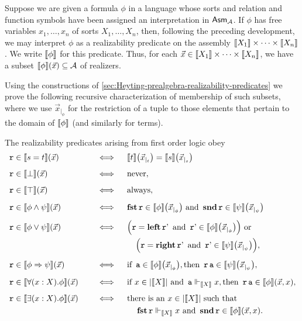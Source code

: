 Suppose we are given a formula \(\phi\) in a language whose sorts and relation
and function symbols have been assigned an interpretation in \(\mathsf{Asm}_{\mathcal A}\).
%
If \(\phi\) has free variables \(x_1,\dots,x_n\) of sorts \(X_1,\dots,X_n\),
then, following the preceding development, we may interpret \(\phi\) as a
realizability predicate on the assembly \(\llbracket X_1\rrbracket \times \cdots\times \llbracket X_n\rrbracket\).
%
We write \(\llbracket\phi\rrbracket\) for this predicate. Thus, for each
\(\vec x \in \llbracket X_1\rrbracket\times\cdots\times\llbracket X_n\rrbracket\), we have a subset
\(\llbracket\phi\rrbracket(\vec x) \subseteq \mathcal A\) of realizers.

Using the constructions of
\cref{sec:Heyting-prealgebra-realizability-predicates} we prove the following
recursive characterization of membership of such subsets, where we use
\(\vec x_{|_\phi}\) for the restriction of a tuple to those elements that
pertain to the domain of \(\llbracket\phi\rrbracket\) (and similarly for terms).

\begin{proposition}\label{realizability-logic}
  The realizability predicates arising from first order logic obey
  \begin{alignat*}{2}
    &\pca{r} \in \sem{s = t}(\vec x)
    &&\quad\iff\quad \sem{t}\pa*{\vec x_{|_t}} = \sem{s}\pa*{\vec x_{|_s}} \\[5pt]
    &\pca{r} \in \sem{\bot}(\vec x)
    &&\quad\iff\quad \text{never}, \\[5pt]
    &\pca{r} \in \sem{\top}(\vec x)
    &&\quad\iff\quad \text{always}, \\[5pt]
    &\pca{r} \in \sem{\phi \land \psi}(\vec x)
    &&\quad\iff\quad \pcafst\pca{r}\in\sem{\phi}\pa[\big]{\vec x_{|_\phi}} \text{ and }
       \pcasnd\pca{r}\in\sem{\psi}\pa[\big]{\vec x_{|_\psi}} \\[5pt]
    &\pca{r} \in \sem{\phi \lor \psi}(\vec x)
    &&\quad\iff\quad
       \pa[\Big]{\pca{r} = \pcaleft\pca{r'}
       \text{ and } \pca{r'}\in \sem{\phi}\pa[\big]{\vec x_{|_\phi}}}
       \text{ or } \\%
    & &&\hspace{60pt} \pa[\Big]{\pca{r} = \pcaright\pca{r'}
         \text{ and } \pca{r'}\in \sem{\psi}\pa[\big]{\vec x_{|_\psi}}}, \\[5pt]
    &\pca{r} \in \sem{\phi \Rightarrow \psi}(\vec x)
    &&\quad\iff\quad \text{if } \pca{a} \in \sem{\phi}\pa[\big]{\vec x_{|_\phi}}, \text{then }
       \pca{r}\pca{a} \in \sem{\psi}\pa[\big]{\vec x_{|_\psi}}, \\[5pt]
    &\pca{r} \in \sem{\forall(x : X).\phi}(\vec x)
    &&\quad\iff\quad \text{if } x \in \carrier{\sem{X}}
       \text{ and } \pca{a} \realizes_{\sem{X}} x, \text{then }
       \pca{r}\pca{a} \in \sem{\phi}(\vec x,x), \\[5pt]
    &\pca{r} \in \sem{\exists(x : X).\phi}(\vec x)
    &&\quad\iff\quad \text{there is an } x \in \carrier{\sem{X}}
       \text{ such that} \\%
    & &&\phantom{\hspace{60pt}} \pcafst\pca{r} \realizes_{\sem{X}} x \text{ and }
         \pcasnd\pca{r} \in \sem{\phi}(\vec x,x).
  \end{alignat*}
\end{proposition}

